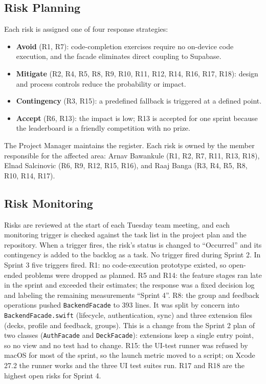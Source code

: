 \documentclass[12pt,letterpaper]{article}
\begin{document}
\subsection{Risk Planning}
Each risk is assigned one of four response strategies:
\begin{itemize}
  \item \textbf{Avoid} (R1, R7): code-completion exercises require no on-device code
        execution, and the facade eliminates direct coupling to Supabase.
  \item \textbf{Mitigate} (R2, R4, R5, R8, R9, R10, R11, R12, R14, R16, R17, R18): design
        and process controls reduce the probability or impact.
  \item \textbf{Contingency} (R3, R15): a predefined fallback is triggered at a
        defined point.
  \item \textbf{Accept} (R6, R13): the impact is low; R13 is accepted for one sprint
        because the leaderboard is a friendly competition with no prize.
\end{itemize}
The Project Manager maintains the register. Each risk is owned by the member
responsible for the affected area: Arnav Bawankule (R1, R2, R7, R11, R13, R18), Elnad
Salcinovic (R6, R9, R12, R15, R16), and Raaj Banga (R3, R4, R5, R8, R10, R14, R17).

\subsection{Risk Monitoring}
Risks are reviewed at the start of each Tuesday team meeting, and each monitoring
trigger is checked against the task list in the project plan and the repository. When a trigger fires, the risk's
status is changed to ``Occurred'' and its contingency is added to the backlog as a
task. No trigger fired during Sprint 2. In Sprint 3 five triggers fired. R1: no
code-execution prototype existed, so open-ended problems were dropped as planned.
R5 and R14: the feature stages ran late in the sprint and exceeded their estimates;
the response was a fixed decision log and labeling the remaining measurements
``Sprint 4''. R8: the group and feedback operations pushed \texttt{BackendFacade} to
393 lines. It was split by concern into \texttt{BackendFacade.swift} (lifecycle,
authentication, sync) and three extension files (decks, profile and feedback, groups).
This is a change from the Sprint 2 plan of two classes (\texttt{AuthFacade} and
\texttt{DeckFacade}): extensions keep a single entry point, so no view and no test had
to change. R15: the UI-test runner was refused by macOS for most of the sprint, so the
launch metric moved to a script; on Xcode 27.2 the runner works and the three UI test
suites run. R17 and R18 are the highest open risks for Sprint 4.
\end{document}
